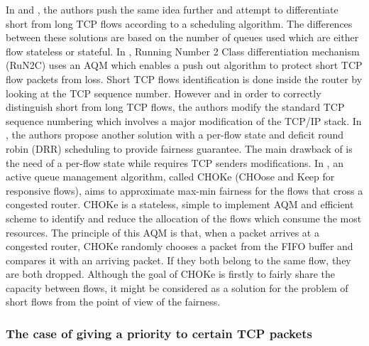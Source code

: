 \documentclass{elsart}
\begin{document}
In \cite{Kantawala02} and \cite{avrachenkov04}, the authors push the same idea further and attempt to differentiate short from long TCP flows according to a scheduling algorithm. 
The differences between these solutions are based on the number of queues used which are either flow stateless or stateful. 
In \cite{avrachenkov04}, Running Number 2 Class differentiation mechanism (RuN2C) uses an AQM which enables a push out algorithm to protect short TCP flow packets from loss. Short TCP flows identification is done inside the router by looking at the TCP sequence number.
However and in order to correctly distinguish short from long TCP flows, the authors modify the standard TCP sequence numbering which involves a major modification of the TCP/IP stack.
In \cite{Kantawala02}, the authors propose another solution with a per-flow state and deficit round robin (DRR) scheduling to provide fairness guarantee. 
The main drawback of \cite{rai05}\cite{Kantawala02} is the need of a per-flow state while \cite{avrachenkov04} requires TCP senders modifications.
In \cite{pan00}, an active queue management algorithm, called CHOKe (CHOose and Keep for responsive flows), aims to approximate max-min fairness for the flows that cross a congested router. CHOKe is a stateless, simple to implement AQM and efficient scheme to identify and reduce the allocation of the flows which consume the most resources. 
The principle of this AQM is that, when a packet arrives at a congested router, CHOKe randomly chooses a packet from the FIFO buffer and compares it with an arriving packet. If they both belong to the same flow, they are both dropped. Although the goal of CHOKe is firstly to fairly share the capacity between flows, it might be considered as a solution for the problem of short flows from the point of view of the fairness.

\subsubsection{The case of giving a priority to certain TCP packets}
\end{document}
